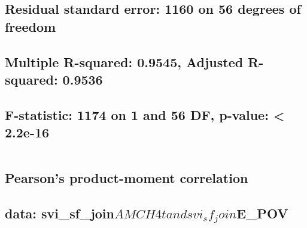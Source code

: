 \documentclass[
  12pt,
]{article}
\begin{document}
\hypertarget{section-89}{%
\subsection{}\label{section-89}}

\hypertarget{residual-standard-error-1160-on-56-degrees-of-freedom}{%
\subsection{Residual standard error: 1160 on 56 degrees of
freedom}\label{residual-standard-error-1160-on-56-degrees-of-freedom}}

\hypertarget{multiple-r-squared-0.9545-adjusted-r-squared-0.9536}{%
\subsection{Multiple R-squared: 0.9545, Adjusted R-squared:
0.9536}\label{multiple-r-squared-0.9545-adjusted-r-squared-0.9536}}

\hypertarget{f-statistic-1174-on-1-and-56-df-p-value-2.2e-16}{%
\subsection{F-statistic: 1174 on 1 and 56 DF, p-value: \textless{}
2.2e-16}\label{f-statistic-1174-on-1-and-56-df-p-value-2.2e-16}}

\begin{verbatim}
\end{verbatim}

\hypertarget{section-90}{%
\subsection{}\label{section-90}}

\hypertarget{pearsons-product-moment-correlation-9}{%
\subsection{Pearson's product-moment
correlation}\label{pearsons-product-moment-correlation-9}}

\hypertarget{section-91}{%
\subsection{}\label{section-91}}

\hypertarget{data-svi_sf_joinamch4t-and-svi_sf_joine_pov}{%
\subsection{\texorpdfstring{data:
svi\_sf\_join\(AMCH4t and svi_sf_join\)E\_POV}{data: svi\_sf\_joinAMCH4t and svi\_sf\_joinE\_POV}}\label{data-svi_sf_joinamch4t-and-svi_sf_joine_pov}}
\end{document}
